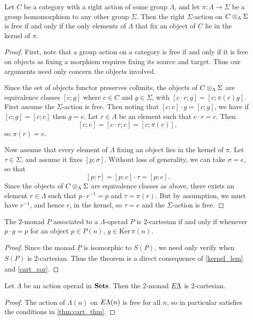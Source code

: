 \begin{lem}\label{lem:kernel_lem}
Let $C$ be a category with a right action of some group $\Lambda$, and let $\pi \colon  \Lambda \rightarrow \Sigma$ be a group homomorphism to any other group $\Sigma$. Then the right $\Sigma$-action on $C \otimes_{\Lambda} \Sigma$ is free if and only if the only elements of $\Lambda$ that fix an object of $C$ lie in the kernel of $\pi$.
\end{lem}
\begin{proof}
First, note that a group action on a category is free if and only if it is free on objects as fixing a morphism requires fixing its source and target. Thus our arguments need only concern the objects involved.

Since the set of objects functor preserves colimits, the objects of $C \otimes_{\Lambda} \Sigma$ are equivalence classes $[c;g]$ where $c \in C$ and $g \in \Sigma$, with $[c\cdot r;g] = [c; \pi(r)g]$. First assume the $\Sigma$-action is free. Then noting that $[c;e]\cdot g =[c;g]$, we have if $[c;g] = [c;e]$ then $g=e$. Let $r \in \Lambda$ be an element such that $c\cdot r = c$. Then
  \[
    [c;e] = [c\cdot r; e] = [c; \pi(r)],
  \]
so $\pi(r) = e$.

Now assume that every element of $\Lambda$ fixing an object lies in the kernel of $\pi$. Let $\tau \in \Sigma$, and assume it fixes $[p; \sigma]$. Without loss of generality, we can take $\sigma = e$, so that
  \[
    [p; \tau] = [p;e]\cdot \tau = [p;e].
  \]
Since the objects of $C \otimes_{\Lambda} \Sigma$ are equivalence classes as above, there exists an element $r \in \Lambda$ such that $p\cdot r^{-1} = p$ and $\tau = \pi(r)$. But by assumption, we must have $r^{-1}$, and hence $r$, in the kernel, so $\tau = e$ and the $\Sigma$-action is free.
\end{proof}

\begin{thm}\label{thm:cart_thm}
The $2$-monad $\underline{P}$ associated to a $\Lambda$-operad $P$ is $2$-cartesian if and only if whenever $p \cdot g = p$ for an object $p \in P(n)$, $g \in \textrm{Ker} \, \pi (n)$.
\end{thm}
\begin{proof}
Since the monad $\underline{P}$ is isomorphic to $\underline{S(P)}$, we need only verify when $\underline{S(P)}$ is $2$-cartesian. Thus the theorem is a direct consequence of \cref{kernel_lem} and \cref{cart_cor}.
\end{proof}

\begin{cor}\label{cor:EL-2cart}
Let $\Lambda$ be an action operad in $\mathbf{Sets}$. Then the $2$-monad $\underline{E\Lambda}$ is 2-cartesian.
\end{cor}
\begin{proof}
The action of $\Lambda(n)$ on $E\Lambda(n)$ is free for all $n$, so in particular satisfies the conditions in \cref{thm:cart_thm}.
\end{proof}

